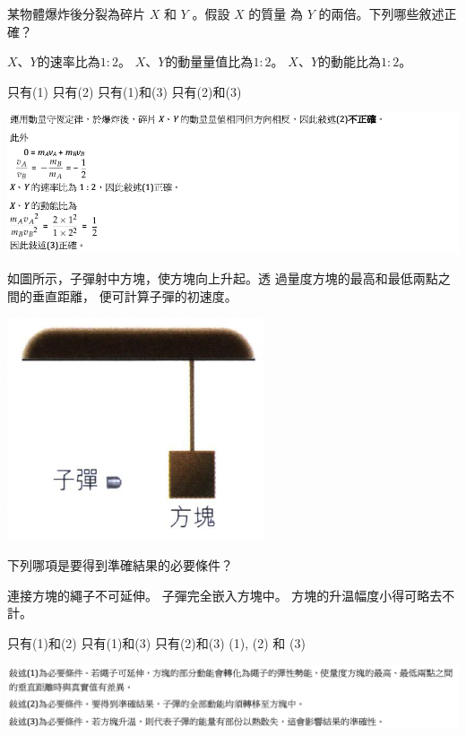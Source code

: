 {
    某物體爆炸後分裂為碎片 $X$ 和 $Y$ 。假設 $X$ 的質量 為 $Y$ 的兩倍。下列哪些敘述正確？
    \begin{statements}
        \task $X$、$Y$的速率比為$1:2$。
        \task $X$、$Y$的動量量值比為$1:2$。
        \task $X$、$Y$的動能比為$1:2$。
    \end{statements}
    \begin{tasks}
        \task 只有(1)
        \task 只有(2)
        \task 只有(1)和(3)
        \task 只有(2)和(3)
    \end{tasks}
}{
    \par{\par\centering\includegraphics[width=\textwidth]{./img/ch5_momentum_mc_2024-05-11-22-50-45.png}\par}
}

{
    如圖所示，子彈射中方塊，使方塊向上升起。透 過量度方塊的最高和最低兩點之間的垂直距離， 便可計算子彈的初速度。
    \par{\par\centering\includegraphics[width=.25\textwidth]{./img/ch5_momentum_mc_2024-05-11-21-19-51.png}\par}
    下列哪項是要得到準確結果的必要條件？
    \begin{statements}
        \task 連接方塊的繩子不可延伸。
        \task 子彈完全嵌入方塊中。
        \task 方塊的升温幅度小得可略去不計。
    \end{statements}
    \begin{tasks}
        \task 只有(1)和(2)
        \task 只有(1)和(3)
        \task 只有(2)和(3)
        \task (1), (2) 和 (3)
    \end{tasks}
}{
    \par{\par\centering\includegraphics[width=\textwidth]{./img/ch5_momentum_mc_2024-05-11-22-50-30.png}\par}
}

